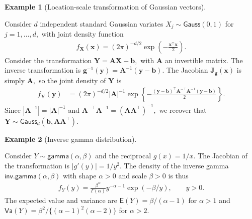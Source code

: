 \documentclass[
  11pt,
  letterpaper,
]{scrbook}
\theoremstyle{definition}
\newtheorem{example}{Example}[chapter]
\theoremstyle{plain}
\theoremstyle{plain}
\theoremstyle{plain}
\theoremstyle{definition}
\theoremstyle{definition}
\theoremstyle{plain}
\theoremstyle{plain}
\theoremstyle{remark}
\begin{document}
\begin{example}[Location-scale transformation of Gaussian
vectors]\protect\hypertarget{exm-locationscale-Gauss}{}\label{exm-locationscale-Gauss}

Consider \(d\) independent standard Gaussian variates
\(X_j \sim \mathsf{Gauss}(0, 1)\) for \(j=1, \ldots, d,\) with joint
density function \begin{align*}
f_{\boldsymbol{X}}(\boldsymbol{x})= (2\pi)^{-d/2} \exp \left( - \frac{\boldsymbol{x}^\top\boldsymbol{x}}{2}\right).
\end{align*} Consider the transformation
\(\boldsymbol{Y} = \mathbf{A}\boldsymbol{X}+\boldsymbol{b},\) with
\(\mathbf{A}\) an invertible matrix. The inverse transformation is
\(\boldsymbol{g}^{-1}(\boldsymbol{y}) = \mathbf{A}^{-1}(\boldsymbol{y}-\boldsymbol{b}).\)
The Jacobian \(\mathbf{J}_{\boldsymbol{g}}(\boldsymbol{x})\) is simply
\(\mathbf{A},\) so the joint density of \(\boldsymbol{Y}\) is
\begin{align*}
f_{\boldsymbol{Y}}(\boldsymbol{y}) &= (2\pi)^{-d/2} |\mathbf{A}|^{-1}\exp \left\{ - \frac{(\boldsymbol{y}-\boldsymbol{b})^\top\mathbf{A}^{-\top}\mathbf{A}^{-1}(\boldsymbol{y}-\boldsymbol{b})}{2}\right\}.
\end{align*} Since \(|\mathbf{A}^{-1}| = |\mathbf{A}|^{-1}\) and
\(\mathbf{A}^{-\top}\mathbf{A}^{-1} = (\mathbf{AA}^\top)^{-1},\) we
recover that
\(\boldsymbol{Y} \sim \mathsf{Gauss}_d(\boldsymbol{b}, \mathbf{AA}^\top).\)

\end{example}

\begin{example}[Inverse gamma
distribution]\protect\hypertarget{exm-inverse-gamma}{}\label{exm-inverse-gamma}

Consider \(Y \sim \mathsf{gamma}(\alpha, \beta)\) and the reciprocal
\(g(x) = 1/x\). The Jacobian of the transformation is
\(|g'(y)| = 1/y^2.\) The density of the inverse gamma
\(\mathsf{inv. gamma}(\alpha, \beta)\) with shape \(\alpha>0\) and scale
\(\beta>0\) is thus \begin{align*}
 f_Y(y) = \frac{\beta^\alpha}{\Gamma(\alpha)} y^{-\alpha-1} \exp(-\beta/y), \qquad y > 0.
\end{align*} The expected value and variance are
\(\mathsf{E}(Y)=\beta/(\alpha-1)\) for \(\alpha > 1\) and
\(\mathsf{Va}(Y) = \beta^2/\{(\alpha-1)^2(\alpha-2)\}\) for
\(\alpha>2.\)

\end{example}
\end{document}

